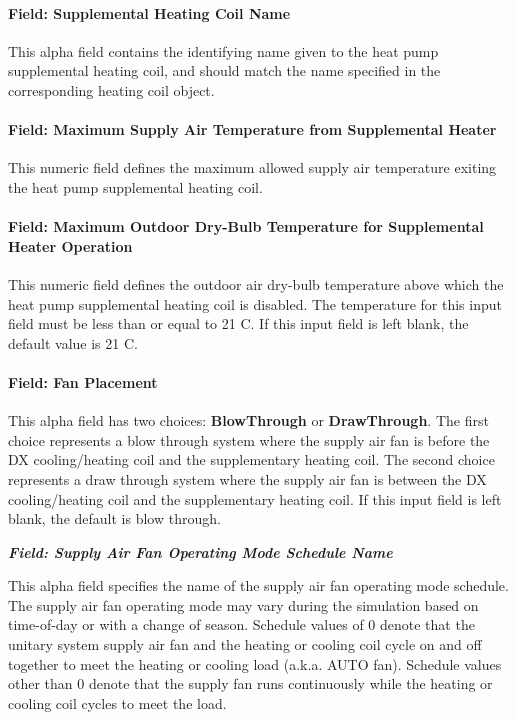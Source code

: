 \paragraph{Field: Supplemental Heating Coil Name}\label{field-supplemental-heating-coil-name-1}

This alpha field contains the identifying name given to the heat pump supplemental heating coil, and should match the name specified in the corresponding heating coil object.

\paragraph{Field: Maximum Supply Air Temperature from Supplemental Heater}\label{field-maximum-supply-air-temperature-from-supplemental-heater}

This numeric field defines the maximum allowed supply air temperature exiting the heat pump supplemental heating coil.

\paragraph{Field: Maximum Outdoor Dry-Bulb Temperature for Supplemental Heater Operation}\label{field-maximum-outdoor-dry-bulb-temperature-for-supplemental-heater-operation-1}

This numeric field defines the outdoor air dry-bulb temperature above which the heat pump supplemental heating coil is disabled. The temperature for this input field must be less than or equal to 21 C. If this input field is left blank, the default value is 21 C.

\paragraph{Field: Fan Placement}\label{field-fan-placement-3}

This alpha field has two choices: \textbf{BlowThrough} or \textbf{DrawThrough}. The first choice represents a blow through system where the supply air fan is before the DX cooling/heating coil and the supplementary heating coil. The second choice represents a draw through system where the supply air fan is between the DX cooling/heating coil and the supplementary heating coil. If this input field is left blank, the default is blow through.

\textbf{\emph{Field: Supply Air Fan Operating Mode Schedule Name}}

This alpha field specifies the name of the supply air fan operating mode schedule. The supply air fan operating mode may vary during the simulation based on time-of-day or with a change of season. Schedule values of 0 denote that the unitary system supply air fan and the heating or cooling coil cycle on and off together to meet the heating or cooling load (a.k.a. AUTO fan). Schedule values other than 0 denote that the supply fan runs continuously while the heating or cooling coil cycles to meet the load.

